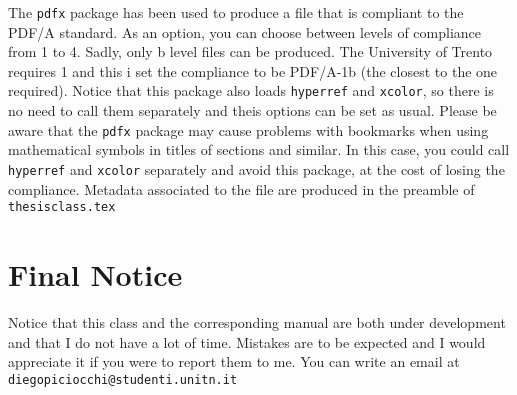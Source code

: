 The \texttt{pdfx} package has been used to produce a file that is compliant to the PDF/A standard. As an option, you can choose between levels of compliance from 1 to 4. Sadly, only b level files can be produced. The University of Trento requires 1 and this i set the compliance to be PDF/A-1b (the closest to the one required). Notice that this package also loads \texttt{hyperref} and \texttt{xcolor}, so there is no need to call them separately and theis options can be set as usual. Please be aware that the \texttt{pdfx} package may cause problems with bookmarks when using mathematical symbols in titles of sections and similar. In this case, you could call \texttt{hyperref} and \texttt{xcolor} separately and avoid this package, at the cost of losing the compliance. Metadata associated to the file are produced in the preamble of \texttt{thesisclass.tex}

\section{Final Notice}

Notice that this class and the corresponding manual are both under development and that I do not have a lot of time. Mistakes are to be expected and I would appreciate it if you were to report them to me. You can write an email at \texttt{diegopiciocchi@studenti.unitn.it} 








